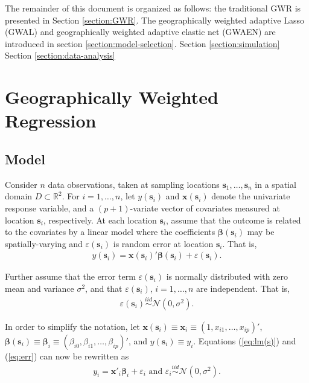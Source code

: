 \documentclass[authoryear, review, 11pt]{elsarticle}
\begin{document}
	The remainder of this document is organized as follows: the traditional GWR is presented in Section \ref{section:GWR}. The geographically weighted adaptive Lasso (GWAL) and geographically weighted adaptive elastic net (GWAEN) are introduced in section \ref{section:model-selection}. Section \ref{section:simulation} Section \ref{section:data-analysis}

\section{Geographically Weighted Regression \label{section:GWR}}
	\subsection{Model}	
	Consider $n$ data observations, taken at sampling locations $\bm{s}_1, \dots, \bm{s}_n$ in a spatial domain $D \subset \mathbb{R}^2$. For $i = 1, \dots, n$, let $y(\bm{s}_i)$ and $\bm{x}(\bm{s}_i)$ denote the univariate response variable, and a $(p+1)$-variate vector of covariates measured at location $\bm{s}_i$, respectively. At each location $\bm{s}_i$, assume that the outcome is related to the covariates by a linear model where the coefficients $\bm{\beta}(\bm{s}_i)$ may be spatially-varying and $\varepsilon(\bm{s}_i)$ is random error at location $\bm{s}_i$. That is,
	\begin{align}\label{eq:lm(s)}
		y(\bm{s}_i) = \bm{x}(\bm{s}_i)' \bm{\beta}(\bm{s}_i) + \varepsilon(\bm{s}_i).
	\end{align}
	
	Further assume that the error term $\varepsilon(\bm{s}_i)$ is normally distributed with zero mean and variance $\sigma^2$, and that $\varepsilon(\bm{s}_i)$, $i=1, \dots, n$ are independent. That is,
	\begin{align} \label{eq:err}
		\varepsilon(\bm{s}_i) \overset{iid}{\sim} \mathcal{N} \left( 0,\sigma^2 \right).
	\end{align}
	
	In order to simplify the notation, let $\bm{x}(\bm{s}_i) \equiv \bm{x}_i \equiv \left( 1, x_{i1}, \dots, x_{ip} \right)'$, $\bm{\beta}(\bm{s}_i) \equiv \bm{\beta}_i \equiv \left(\beta_{i0}, \beta_{i1}, \dots, \beta_{ip} \right)'$, and $y(\bm{s}_i) \equiv y_i$.  Equations (\ref{eq:lm(s)}) and (\ref{eq:err}) can now be rewritten as
	\begin{align}
		y_i = \bm{x}'_i \bm{\beta}_i + \varepsilon_i \text{ and } \varepsilon_i \overset{iid}{\sim} \mathcal{N} \left( 0,\sigma^2 \right).
	\end{align}
	
\end{document}
